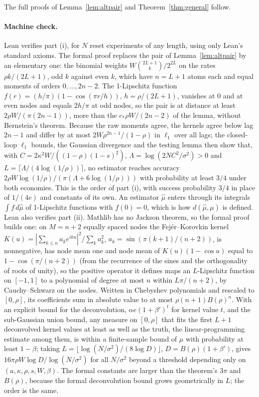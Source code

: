 \documentclass[12pt]{article}
\theoremstyle{definition}
\theoremstyle{remark}
\begin{document}
The full proofs of Lemma~\ref{lem:altpair} and Theorem~\ref{thm:general} follow.


\paragraph{Machine check.} Lean verifies part (i), for $N$ reset experiments of any length, using only Lean's standard axioms. The formal proof replaces the pair of Lemma~\ref{lem:altpair} by an elementary one: the binomial weights $W\binom{2L+1}{k}/2^{2L}$ on the rates $\rho k/(2L+1)$, odd $k$ against even $k$, which have $n=L+1$ atoms each and equal moments of orders $0,\ldots,2n-2$. The 1-Lipschitz function $f(r)=(h/\pi)(1-\cos(\pi r/h))$, $h=\rho/(2L+1)$, vanishes at $0$ and at even nodes and equals $2h/\pi$ at odd nodes, so the pair is at distance at least $2\rho W/(\pi(2n-1))$, more than the $c_*\rho W/(2n-2)$ of the lemma, without Bernstein's theorem. Because the raw moments agree, the kernels agree below lag $2n-1$ and differ by at most $2W\rho^{2n-1}/(1-\rho)$ in $\ell_1$ over all lags; the closed-loop $\ell_1$ bounds, the Gaussian divergence and the testing lemma then show that, with $C=2\kappa^2W/((1-\rho)(1-s)^2)$, $\Lambda=\log(2NC^2/\sigma^2)>0$ and $L=\lceil\Lambda/(4\log(1/\rho))\rceil$, no estimator reaches accuracy $2\rho W\log(1/\rho)/(\pi(\Lambda+6\log(1/\rho)))$ with probability at least $3/4$ under both economies. This is the order of part (i), with success probability $3/4$ in place of $1/(4e)$ and constants of its own. An estimator $\hat\mu$ enters through its integrals $\int f\,d\hat\mu$ of 1-Lipschitz functions with $f(0)=0$, which is how $d(\hat\mu,\mu)$ is defined. Lean also verifies part (ii). Mathlib has no Jackson theorem, so the formal proof builds one: on $M=n+2$ equally spaced nodes the Fejér--Korovkin kernel $K(u)=|\sum_{k\le n}a_ke^{iku}|^2/\sum_ka_k^2$, $a_k=\sin(\pi(k+1)/(n+2))$, is nonnegative, has node mean one and node mean of $K(u)(1-\cos u)$ equal to $1-\cos(\pi/(n+2))$ (from the recurrence of the sines and the orthogonality of roots of unity), so the positive operator it defines maps an $L$-Lipschitz function on $[-1,1]$ to a polynomial of degree at most $n$ within $L\pi/(n+2)$, by Cauchy--Schwarz on the nodes. Written in Chebyshev polynomials and rescaled to $[0,\rho]$, its coefficients sum in absolute value to at most $\rho(n+1)B(\rho)^n$. With an explicit bound for the deconvolution, $\alpha e(1+\beta')^t$ for kernel value $t$, and the sub-Gaussian union bound, any measure on $[0,\rho]$ that fits the first $L+1$ deconvolved kernel values at least as well as the truth, the linear-programming estimate among them, is within a finite-sample bound of $\mu$ with probability at least $1-\beta$; taking $L=\lfloor\log(N/\sigma^2)/(8\log D)\rfloor$, $D=B(\rho)(1+\beta')$, gives $16\pi\rho W\log D/\log(N/\sigma^2)$ for all $N/\sigma^2$ beyond a threshold depending only on $(a,\kappa,\rho,s,W,\beta)$. The formal constants are larger than the theorem's $3\pi$ and $B(\rho)$, because the formal deconvolution bound grows geometrically in $L$; the order is the same.
\end{document}
